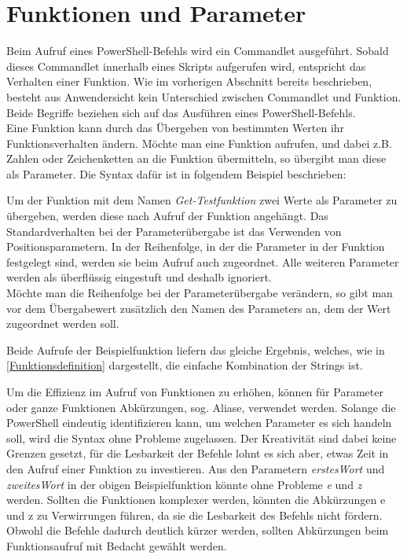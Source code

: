 \section{Funktionen und Parameter}\label{sec:funcundPara}
Beim Aufruf eines PowerShell-Befehls wird ein Commandlet ausgeführt. Sobald dieses Commandlet innerhalb eines Skripts aufgerufen wird, entspricht das Verhalten einer Funktion. Wie im vorherigen Abschnitt bereits beschrieben, besteht aus Anwendersicht kein Unterschied zwischen Commandlet und Funktion. Beide Begriffe beziehen sich auf das Ausführen eines PowerShell-Befehls.\medskip\\
Eine Funktion kann durch das Übergeben von bestimmten Werten ihr Funktionsverhalten ändern. Möchte man eine Funktion aufrufen, und dabei z.B. Zahlen oder Zeichenketten an die Funktion übermitteln, so übergibt man diese als Parameter. Die Syntax dafür ist in folgendem Beispiel beschrieben:

Um der Funktion mit dem Namen \textit{Get-Testfunktion} zwei Werte als Parameter zu übergeben, werden diese nach Aufruf der Funktion angehängt. Das Standardverhalten bei der Parameterübergabe ist das Verwenden von Positionsparametern. In der Reihenfolge, in der die Parameter in der Funktion festgelegt sind, werden sie beim Aufruf auch zugeordnet. Alle weiteren Parameter werden als überflüssig eingestuft und deshalb ignoriert.\medskip\\
Möchte man die Reihenfolge bei der Parameterübergabe verändern, so gibt man vor dem Übergabewert zusätzlich den Namen des Parameters an, dem der Wert zugeordnet werden soll.

Beide Aufrufe der Beispielfunktion liefern das gleiche Ergebnis, welches, wie in \autoref{Funktionsdefinition} dargestellt, die einfache Kombination der Strings ist.

Um die Effizienz im Aufruf von Funktionen zu erhöhen, können für Parameter oder ganze Funktionen Abkürzungen, sog. Aliase, verwendet werden. Solange die \mbox{PowerShell} eindeutig identifizieren kann, um welchen Parameter es sich handeln soll, wird die Syntax ohne Probleme zugelassen. Der Kreativität sind dabei keine Grenzen gesetzt, für die Lesbarkeit der Befehle lohnt es sich aber, etwas Zeit in den Aufruf einer Funktion zu investieren. Aus den Parametern \textit{erstesWort} und \textit{zweitesWort} in der obigen Beispielfunktion könnte ohne Probleme \textit{e} und \textit{z} werden. Sollten die Funktionen komplexer werden, könnten die Abkürzungen e und z zu Verwirrungen führen, da sie die Lesbarkeit des Befehls nicht fördern. Obwohl die Befehle dadurch deutlich kürzer werden, sollten Abkürzungen beim Funktionsaufruf mit Bedacht gewählt werden.
